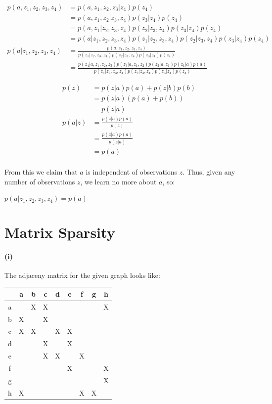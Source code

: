 \documentclass[12pt]{article}
\begin{document}
\begin{enumerate}
	\begin{align*}
	p(a,z_1,z_2,z_3,z_4) &= p(a,z_1,z_2,z_3|z_4)p(z_4) \\
					  &=  p(a,z_1,z_2|z_3,z_4)p(z_3|z_4)p(z_4) \\
					  &=  p(a,z_1|z_2,z_3,z_4)p(z_2|z_3,z_4)p(z_3|z_4)p(z_4) \\
					  &=  p(a|z_1,z_2,z_3,z_4)p(z_1|z_2,z_3,z_4)p(z_2|z_3,z_4)p(z_3|z_4)p(z_4) \\
	p(a|z_1,z_2,z_3,z_4) &=	\frac{p(a,z_1,z_2,z_3,z_4)}{p(z_1|z_2,z_3,z_4)p(z_2|z_3,z_4)p(z_3|z_4)p(z_4)} \\
	 				  &=  \frac{p(z_4|a,z_1,z_2,z_3)p(z_3|a,z_1,z_2)p(z_2|a,z_1)p(z_1|a)p(a)}{p(z_1|z_2,z_3,z_4)p(z_2|z_3,z_4)p(z_3|z_4)p(z_4)}
	\end{align*}

    \begin{align*}
    p(z) &= p(z|a)p(a) + p(z|b)p(b) \\
        &= p(z|a)(p(a) + p(b)) \\
        &= p(z|a) \\
    p(a|z) &= \frac{p(z|a)p(a)}{p(z)} \\
        &= \frac{p(z|a)p(a)}{p(z|a)} \\
        &= p(a) \\
    \end{align*}

    From this we claim that $a$ is independent of observations $z$. Thus, given
    any number of observations $z$, we learn no more about $a$, so:

    $p(a|z_1,z_2,z_3,z_4) = p(a)$
\end{enumerate}


\section{Matrix Sparsity}

\paragraph{(i)}
The adjaceny matrix for the given graph looks like:

\begin{tabular}{| c || c | c | c | c | c | c | c | c |}
\hline
& a & b & c & d & e & f & g & h \\
\hline \hline
a & & X & X & & & & & X \\
\hline
b & X & & X & & & & & \\
\hline
c & X & X & & X & X & & & \\
\hline
d & & & X & & X & & & \\
\hline
e & & & X & X & & X & & \\
\hline
f & & & & & X & & & X  \\
\hline
g & & & & & & & & X \\
\hline
h & X & & & & & X & X & \\
\hline
\end{tabular}
\end{document}
